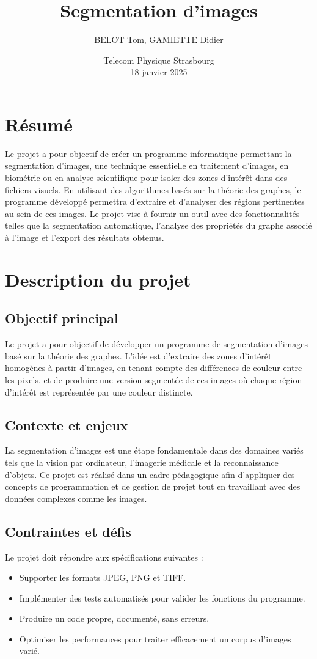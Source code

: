 \documentclass[a4paper,12pt]{report}
\title{Segmentation d'images}
\author{BELOT Tom, GAMIETTE Didier}
\date{Telecom Physique Strasbourg \\ 18 janvier 2025}
\begin{document}
\maketitle

\tableofcontents %
\newpage

\chapter{Résumé}
Le projet a pour objectif de créer un programme informatique permettant la segmentation d'images, une technique essentielle en traitement d'images, en biométrie ou en analyse scientifique pour isoler des zones d'intérêt dans des fichiers visuels.  En utilisant des algorithmes basés sur la théorie des graphes, le programme développé permettra d’extraire et d’analyser des régions pertinentes au sein de ces images. Le projet vise à fournir un outil avec des fonctionnalités telles que la segmentation automatique, l’analyse des propriétés du graphe associé à l’image et l’export des résultats obtenus.

\chapter{Description du projet}

\section{Objectif principal}
Le projet a pour objectif de développer un programme de segmentation d'images basé sur la théorie des graphes. L'idée est d'extraire des zones d'intérêt homogènes à partir d'images, en tenant compte des différences de couleur entre les pixels, et de produire une version segmentée de ces images où chaque région d'intérêt est représentée par une couleur distincte.

\section{Contexte et enjeux}
La segmentation d'images est une étape fondamentale dans des domaines variés tels que la vision par ordinateur, l'imagerie médicale et la reconnaissance d'objets. Ce projet est réalisé dans un cadre pédagogique afin d'appliquer des concepts de programmation et de gestion de projet tout en travaillant avec des données complexes comme les images.

\section{Contraintes et défis}
Le projet doit répondre aux spécifications suivantes :
\begin{itemize}
    \item Supporter les formats JPEG, PNG et TIFF.
    \item Implémenter des tests automatisés pour valider les fonctions du programme.
    \item Produire un code propre, documenté, sans erreurs.
    \item Optimiser les performances pour traiter efficacement un corpus d'images varié.
\end{itemize}
\end{document}
